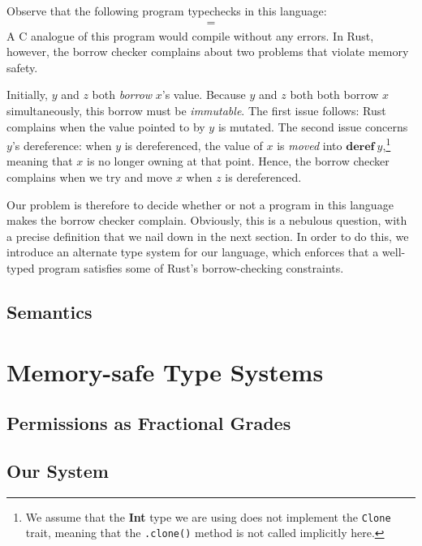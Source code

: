 \documentclass{article}
\renewcommand\em{\bfseries}
\newcommand{\deref}{\textbf{deref}~}%
\begin{document}
Observe that the following program typechecks in this language:
\begin{align*}
    =
\end{align*}
A C analogue of this program would compile without any errors. In Rust, however, the borrow checker complains about two problems that violate memory safety. 

Initially, $y$ and $z$ both \textit{borrow} $x$'s value. Because $y$ and $z$ both both borrow $x$ simultaneously, this borrow must be \textit{immutable}. The first issue follows: Rust complains when the value pointed to by $y$ is mutated. The second issue concerns $y$'s dereference: when $y$ is dereferenced, the value of $x$ is \textit{moved} into $\deref y$,\footnote{We assume that the \textbf{Int} type we are using does not implement the \texttt{Clone} trait, meaning that the \texttt{.clone()} method is not called implicitly here.} meaning that $x$ is no longer owning at that point. Hence, the borrow checker complains when we try and move $x$ when $z$ is dereferenced. 

Our problem is therefore to decide whether or not a program in this language makes the borrow checker complain. Obviously, this is a nebulous question, with a precise definition that we nail down in the next section. In order to do this, we introduce an alternate type system for our language, which enforces that a well-typed program satisfies some of Rust's borrow-checking constraints.


\subsection{Semantics}



\section{Memory-safe Type Systems}


\subsection{Permissions as Fractional Grades}

\subsection{Our System}







\renewcommand\em{\it}
\printbibliography[title={References}]
\end{document}
